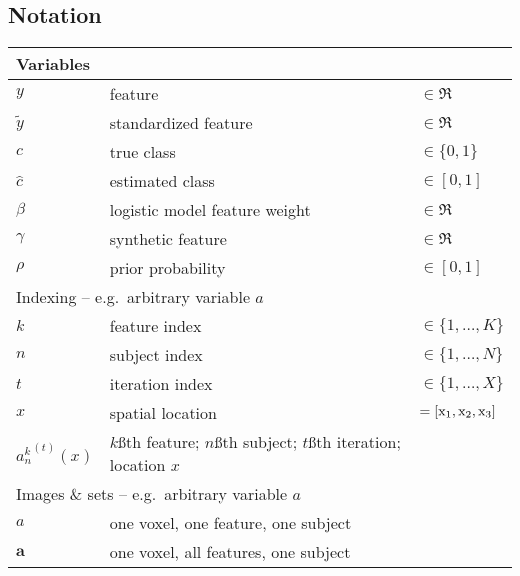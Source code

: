 \begin{singlespacing}
\subsection*{Notation}
\begin{table}[H]
  \begin{tabular}{lll}
  	\toprule
  	\multicolumn{3}{l}{Variables}                                                              \\
    \midrule
  	$y$                   & feature                                      & $\in\Re$            \\
  	$\tilde{y}$           & standardized feature                         & $\in\Re$            \\
  	$c$                   & true class                                   & $\in\{0,1\}$        \\
  	$\hat{c}$             & estimated class                              & $\in[0,1]$          \\
  	$\beta$               & logistic model feature weight                & $\in\Re$            \\
  	$\gamma$              & synthetic feature                            & $\in\Re$            \\
  	$\rho$                & prior probability                            & $\in[0,1]$          \\
    \midrule
  	\multicolumn{3}{l}{Indexing -- e.g.\ arbitrary variable $a$}                               \\
    \midrule
  	$k$                   & feature index                                & $\in \{1,\dots,K\}$ \\
  	$n$                   & subject index                                & $\in \{1,\dots,N\}$ \\
  	$t$                   & iteration index                              & $\in \{1,\dots,X\}$ \\
  	$x$                   & spatial location                             & $= [\mathrm{x}_1,\mathrm{x}_2,\mathrm{x}_3]$          \\
   	${a_n^k}^{(t)}(x)$&$k$\ss{th} feature; $n$\ss{th} subject; $t$\ss{th} iteration; location $x$&\\
    \midrule
  	\multicolumn{3}{l}{Images \& sets -- e.g.\ arbitrary variable $a$}                         \\
    \midrule
  	$a$                   & one voxel, one feature, one subject          &                     \\
  	$\bm{a}$              & one voxel, all features, one subject         &                     \\

\end{tabular}
\end{table}
\end{singlespacing}
